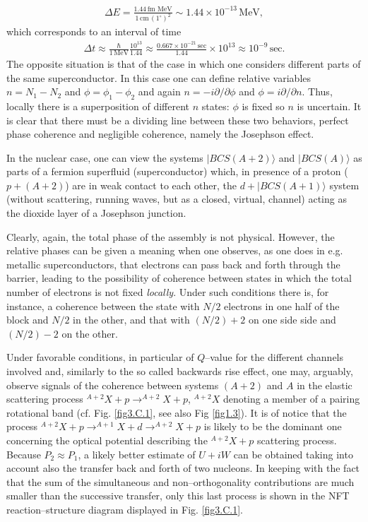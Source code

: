 \begin{align}
\Delta E=\frac{1.44\,\text{fm MeV}}{1\,\text{cm}\,(1^{\circ})^2}\sim 1.44 \times 10^{-13}\,\text{MeV},
\end{align}
which corresponds to an interval of time 
\begin{align}
\Delta t\approx \frac{\hbar}{1\,\text{MeV}}\frac{10^{13}}{1.44}\approx\frac{0.667\times 10^{-21}\,\text{sec}}{1.44}\times 10^{13}\approx 10^{-9}\,\text{sec}.
\end{align}
The opposite situation is that of the case in which one considers different parts of the same superconductor. In this case one can define relative variables $n=N_1-N_2$ and $\phi=\phi_1-\phi_2$ and again $n=-i\partial/\partial \phi$ and $\phi=i\partial/\partial n$. Thus, locally there is a superposition of different $n$ states: $\phi$ is fixed so $n$ is uncertain. It is clear that there must be a dividing line between these two behaviors, perfect phase coherence and negligible coherence, namely the Josephson effect.


In the nuclear case, one can view the systems $|BCS(A+2)\rangle$ and $|BCS(A)\rangle$ as parts of a fermion superfluid (superconductor) which, in presence of a proton ($p+(A+2)$) are in weak contact to each other, the $d+|BCS(A+1)\rangle$ system (without scattering, running waves, but as a closed, virtual, channel) acting as the dioxide layer of a Josephson junction.


Clearly, again, the total phase of the assembly is not physical. However, the relative phases can be given a meaning when one observes, as one does in e.g. metallic superconductors, that electrons can pass back and forth through the barrier, leading to the possibility of coherence between states in which the total number of electrons is not fixed \emph{locally}. Under such conditions there is, for instance, a coherence between the state with $N/2$ electrons in one half of the block and $N/2$ in the other, and that with $(N/2)+2$ on one side side and $(N/2)-2$ on the other.


Under  favorable conditions, in particular of $Q$--value for the different channels involved and, similarly to the so called backwards rise effect, one may, arguably, observe signals of the coherence between systems $(A+2)$ and $A$ in the elastic scattering process $^{A+2}X+p\rightarrow  ^{A+2}X+p$, $^{A+2}X$ denoting a member of a pairing rotational band (cf. Fig. \ref{fig3.C.1}, see also Fig \ref{fig1.3}). It is of notice that the process $^{A+2}X+p\rightarrow^{A+1}X+d\rightarrow^{A+2}X+p$ is likely to be the dominant one concerning the optical potential describing the $^{A+2}X+p$ scattering process. Because $P_2\approx P_1$, a likely better estimate of $U+iW$ can be obtained taking into account also the transfer back and forth of two nucleons. In keeping with the fact that the sum of the simultaneous and non--orthogonality contributions are much smaller than the successive transfer, only this last process is shown in the NFT reaction--structure diagram displayed in Fig. \ref{fig3.C.1}.




